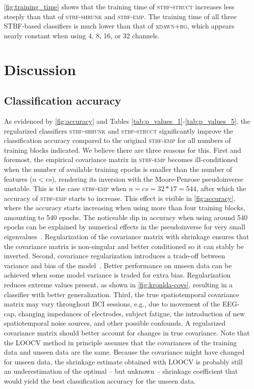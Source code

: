 	\autoref{fig:training_time} shows that the training time of
	\textsc{stbf-struct} increases less steeply than that of \textsc{stbf-shrunk}
	and \textsc{stbf-emp}. The training time of all three STBF-based classifiers is
	much lower than that of x\textsc{dawn+rg}, which appears nearly constant when using
	4, 8, 16, or 32 channels.

	\section{Discussion}

	\subsection{Classification accuracy}
	As evidenced by \autoref{fig:accuracy} and Tables \ref{tab:p_values_1}-\ref{tab:p_values_5}, the regularized classifiers \textsc{stbf-shrunk}
	and \textsc{stbf-struct} significantly improve the classification accuracy
	compared to the original \textsc{stbf-emp} for all numbers of training blocks
	indicated.
	We believe there are three reasons for this.
	First and foremost, the empirical covariance matrix in \textsc{stbf-emp} becomes
	ill-conditioned when the number of available training epochs is smaller than
	the number of features ($n<cs$), rendering its inversion with the
	Moore-Penrose pseudoinverse unstable.
	This is the case \textsc{stbf-emp} when $n=cs=32*17=544$, after which the
	accuracy of \textsc{stbf-emp} starts to increase.
	This effect is visible in \autoref{fig:accuracy}, where the accuracy starts
	increasing when using more than four training blocks, amounting to 540 epochs.
	The noticeable dip in accuracy when using around 540 epochs can be explained by
	numerical effects in the pseudoinverse for very small
	eigenvalues~\cite{Blankertz2011, Raudys1998, Schaefer2004,
		Kraemer2009}.
	Regularization of the covariance matrix with shrinkage ensures that the
	covariance matrix is non-singular and better conditioned so it can stably be inverted.
	Second, covariance regularization introduces a trade-off between variance and bias of the model~\cite{Ledoit2004}.
	Better performance on unseen data can be achieved when some model variance is
	traded for extra bias.
	Regularization reduces extreme values present, as shown in
	\autoref{fig:kronlda-covs}, resulting in a classifier with
	better generalization.
	Third, the true spatiotemporal covariance matrix may vary throughout BCI
	sessions, e.g., due to movement of the EEG-cap, changing impedances of
	electrodes, subject fatigue, the introduction of new spatiotemporal noise
	sources, and other possible confounds.
	A regularized covariance matrix should better account for changes in true covariance.
	Note that the LOOCV method in principle assumes that the covariances of
	the training data and unseen data are the same.
	Because the covariance might have changed for unseen data, the shrinkage
	estimate obtained with LOOCV is probably still an
	underestimation of the optimal -- but unknown -- shrinkage coefficient that
	would yield the best classification accuracy for the unseen data.

